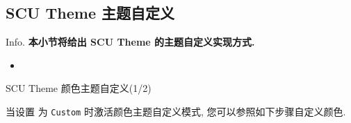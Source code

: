 \subsection{SCU Theme 主题自定义}
\begin{frame}{Info.}
	\textbf{本小节将给出 SCU Theme 的主题自定义实现方式.}
	\begin{multicols}{2}
		\begin{itemize}
			\item {}
		\end{itemize}
	\end{multicols}
	\mycopyright
\end{frame}

\begin{frame}{SCU Theme 颜色主题自定义(1/2) }\label{goto:CustomColorTheme}

  当设置  为 \texttt{Custom} 时激活颜色主题自定义模式, 您可以参照如下步骤自定义颜色.\\

  \begin{columns}[T, onlytextwidth]
    \begin{column}{.67\textwidth}
      \\


\end{column}
\end{columns}
\end{frame}
